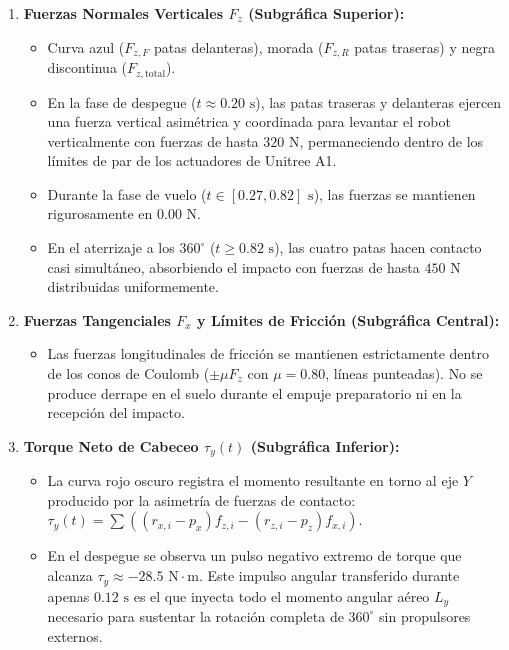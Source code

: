 \documentclass[11pt,a4paper]{article}
\begin{document}
\begin{enumerate}
    \item \textbf{Fuerzas Normales Verticales $F_z$ (Subgráfica Superior):}
    \begin{itemize}
        \item Curva azul ($F_{z,F}$ patas delanteras), morada ($F_{z,R}$ patas traseras) y negra discontinua ($F_{z,\text{total}}$).
        \item En la fase de despegue ($t \approx 0.20\text{ s}$), las patas traseras y delanteras ejercen una fuerza vertical asimétrica y coordinada para levantar el robot verticalmente con fuerzas de hasta $320\text{ N}$, permaneciendo dentro de los límites de par de los actuadores de Unitree A1.
        \item Durante la fase de vuelo ($t \in [0.27, 0.82]\text{ s}$), las fuerzas se mantienen rigurosamente en $0.00\text{ N}$.
        \item En el aterrizaje a los $360^\circ$ ($t \ge 0.82\text{ s}$), las cuatro patas hacen contacto casi simultáneo, absorbiendo el impacto con fuerzas de hasta $450\text{ N}$ distribuidas uniformemente.
    \end{itemize}

    \item \textbf{Fuerzas Tangenciales $F_x$ y Límites de Fricción (Subgráfica Central):}
    \begin{itemize}
        \item Las fuerzas longitudinales de fricción se mantienen estrictamente dentro de los conos de Coulomb ($\pm \mu F_z$ con $\mu = 0.80$, líneas punteadas). No se produce derrape en el suelo durante el empuje preparatorio ni en la recepción del impacto.
    \end{itemize}

    \item \textbf{Torque Neto de Cabeceo $\tau_y(t)$ (Subgráfica Inferior):}
    \begin{itemize}
        \item La curva rojo oscuro registra el momento resultante en torno al eje $Y$ producido por la asimetría de fuerzas de contacto: $\tau_y(t) = \sum ((r_{x,i} - p_x) f_{z,i} - (r_{z,i} - p_z) f_{x,i})$.
        \item En el despegue se observa un pulso negativo extremo de torque que alcanza $\tau_y \approx -28.5\text{ N}\cdot\text{m}$. Este impulso angular transferido durante apenas $0.12\text{ s}$ es el que inyecta todo el momento angular aéreo $L_y$ necesario para sustentar la rotación completa de $360^\circ$ sin propulsores externos.
    \end{itemize}
\end{enumerate}
\end{document}
